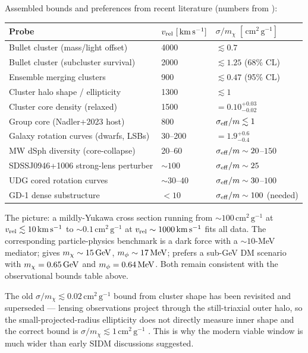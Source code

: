 \documentclass[12pt]{article}
\newcommand{\cmg}{\,\mathrm{cm^2\,g^{-1}}}
\newcommand{\kms}{\,\mathrm{km\,s^{-1}}}
\newcommand{\smx}{\sigma/m_\chi}
\newcommand{\vrel}{v_{\rm rel}}
\begin{document}
Assembled bounds and preferences from recent literature (numbers from
\citealt{Kaplinghat2016,TulinYu2018,Nadler2023,Palubski2025}):

\begin{tabularx}{\linewidth}{@{}l l X@{}}
\toprule
Probe & $\vrel\;[\kms]$ & $\smx\;[\cmg]$ \\
\midrule
Bullet cluster (mass/light offset)          & 4000
   & $\lesssim 0.7$ \\
Bullet cluster (subcluster survival)        & 2000
   & $\lesssim 1.25$ (68\% CL) \\
Ensemble merging clusters                   & 900
   & $\lesssim 0.47$ (95\% CL) \\
Cluster halo shape / ellipticity            & 1300
   & $\lesssim 1$ \citep{TulinYu2018} \\
Cluster core density (relaxed)              & 1500
   & $= 0.10^{+0.03}_{-0.02}$ \citep{Kaplinghat2016} \\
Group core (Nadler+2023 host)               & 800
   & $\sigma_{\rm eff}/m \lesssim 1$ \\
Galaxy rotation curves (dwarfs, LSBs)       & 30--200
   & $= 1.9^{+0.6}_{-0.4}$ \citep{Kaplinghat2016} \\
MW dSph diversity (core-collapse)           & 20--60
   & $\sigma_{\rm eff}/m \sim 20$--$150$ \citep{Correa2021} \\
SDSSJ0946+1006 strong-lens perturber        & $\sim 100$
   & $\sigma_{\rm eff}/m \sim 25$ \citep{Nadler2023} \\
UDG cored rotation curves                   & $\sim 30$--$40$
   & $\sigma_{\rm eff}/m \sim 30$--$100$ \citep{Nadler2023} \\
GD-1 dense substructure                     & $<10$
   & $\sigma_{\rm eff}/m \sim 100$ (needed) \\
\bottomrule
\end{tabularx}

The picture: a mildly-Yukawa cross section running from
$\sim\!100\cmg$ at $\vrel\lesssim 10\kms$ to $\sim\!0.1\cmg$ at
$\vrel\sim 1000\kms$ fits all data.  The corresponding
particle-physics benchmark is a dark force with a $\sim 10$-MeV
mediator; \citet{Kaplinghat2016} gives $m_\chi\sim 15\,{\rm GeV}$,
$m_\phi\sim 17\,{\rm MeV}$; \citet{Correa2021} prefers a sub-GeV DM
scenario with $m_\chi = 0.65\,{\rm GeV}$ and $m_\phi = 0.64\,{\rm
MeV}$.  Both remain consistent with the observational bounds table
above.

The old $\smx\lesssim 0.02\cmg$ bound from cluster shape
\citep{MiraldaEscude2000} has been revisited and superseded ---
lensing observations project through the still-triaxial outer halo,
so the small-projected-radius ellipticity does not directly measure
inner shape and the correct bound is $\smx\lesssim 1\cmg$
\citep{TulinYu2018}.  This is why the modern viable window is much
wider than early SIDM discussions suggested.
\end{document}
